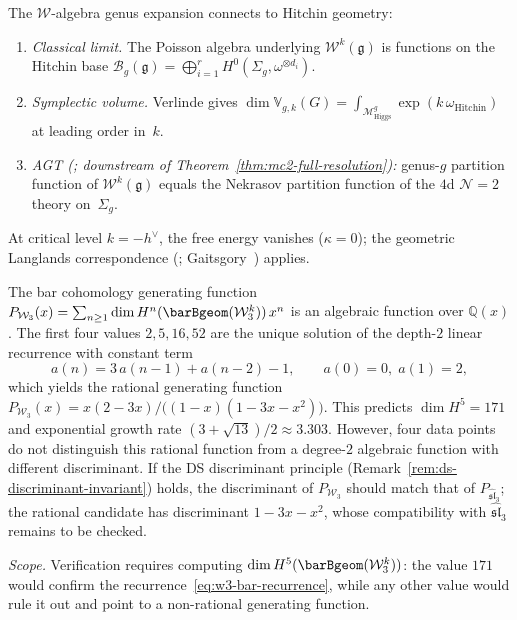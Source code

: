 \begin{remark}
\label{rem:w-higgs-connections}
The $\mathcal{W}$-algebra genus expansion connects to Hitchin geometry:
\begin{enumerate}[label=\textup{(\roman*)}]
\item \emph{Classical limit.}  The Poisson algebra underlying $\mathcal{W}^k(\mathfrak{g})$ is functions on the Hitchin base $\mathcal{B}_g(\mathfrak{g}) = \bigoplus_{i=1}^r H^0(\Sigma_g, \omega^{\otimes d_i})$.
\item \emph{Symplectic volume.}  Verlinde gives $\dim \mathbb{V}_{g,k}(G) = \int_{\mathcal{M}_{\mathrm{Higgs}}^g} \exp(k\,\omega_{\mathrm{Hitchin}})$ at leading order in~$k$.
\item \emph{AGT \textup{(\ClaimStatusConjectured; downstream of Theorem~\ref{thm:mc2-full-resolution})}:} genus-$g$ partition function of $\mathcal{W}^k(\mathfrak{g})$ equals the Nekrasov partition function of the $4$d $\mathcal{N}=2$ theory on~$\Sigma_g$.
\end{enumerate}
At critical level $k = -h^\vee$, the free energy vanishes ($\kappa = 0$); the geometric Langlands correspondence (\ClaimStatusProvedElsewhere; Gaitsgory~\cite{Gai19}) applies.
\end{remark}

\begin{conjecture}
\label{conj:w3-algebraicity}
The bar cohomology generating function $P_{\mathcal{W}_3}(x) = \sum_{n \geq 1} \dim H^n(\barBgeom(\mathcal{W}_3^k))\, x^n$ is an algebraic function over $\mathbb{Q}(x)$.  The first four values $2, 5, 16, 52$ are the unique solution of the depth-$2$ linear recurrence with constant term
\begin{equation}\label{eq:w3-bar-recurrence}
a(n) = 3\,a(n{-}1) + a(n{-}2) - 1, \qquad a(0) = 0,\; a(1) = 2,
\end{equation}
which yields the rational generating function
$P_{\mathcal{W}_3}(x) = x(2-3x)/\bigl((1-x)(1-3x-x^2)\bigr)$.
This predicts $\dim H^5 = 171$ and exponential growth rate
$(3+\sqrt{13})/2 \approx 3.303$.
However, four data points do not distinguish this rational function
from a degree-$2$ algebraic function with different discriminant.
If the DS discriminant principle
(Remark~\ref{rem:ds-discriminant-invariant}) holds,
the discriminant of $P_{\mathcal{W}_3}$ should match that of
$P_{\widehat{\mathfrak{sl}}_3}$; the rational candidate has
discriminant $1 - 3x - x^2$, whose compatibility with
$\widehat{\mathfrak{sl}}_3$ remains to be checked.

\emph{Scope.}  Verification requires computing $\dim H^5(\barBgeom(\mathcal{W}_3^k))$: the value $171$ would confirm the recurrence~\eqref{eq:w3-bar-recurrence}, while any other value would rule it out and point to a non-rational generating function.
\end{conjecture}

